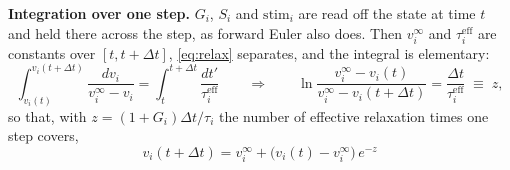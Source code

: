 \documentclass[10pt,a4paper]{article}
\newcommand{\dt}{\Delta t}
\begin{document}
\textbf{Integration over one step.} $G_i$, $S_i$ and $\mathrm{stim}_i$ are read off the state
at time $t$ and held there across the step, as forward Euler also does. Then $v^{\infty}_i$ and $\tau^{\mathrm{eff}}_i$ are constants over
$[t,t+\dt]$, \eqref{eq:relax} separates, and the integral is elementary:
\begin{equation}
\int_{v_i(t)}^{v_i(t+\dt)}\frac{dv_i}{v^{\infty}_i-v_i}
=\int_{t}^{t+\dt}\frac{dt'}{\tau^{\mathrm{eff}}_i}
\qquad\Longrightarrow\qquad
\ln\frac{v^{\infty}_i-v_i(t)}{v^{\infty}_i-v_i(t+\dt)}
=\frac{\dt}{\tau^{\mathrm{eff}}_i}\;\equiv\;z ,
\end{equation}
so that, with $z=(1+G_i)\dt/\tau_i$ the number of effective relaxation times one
step covers,
\begin{equation}
\boxed{\;v_i(t+\dt)=v^{\infty}_i+\bigl(v_i(t)-v^{\infty}_i\bigr)\,e^{-z}\;}
\label{eq:exact}
\end{equation}
\end{document}
